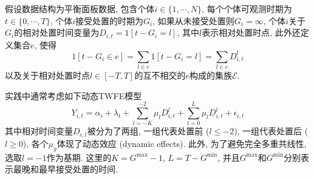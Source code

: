 \documentclass[cn,blue,14pt,screen,bibstyle=gb7714-2015]{elegantnote}
\begin{document}
假设数据结构为平衡面板数据, 包含个体$i\in\{1,\cdots,N\}$, 每个个体可观测时期为$t\in\{0,\cdots,T\}$, 个体$i$接受处置的时期为$G_i$, 如果从未接受处置则$G_i=\infty$, 个体$i$关于$G_i$的相对处置时间变量为$D_{i,t}=1[t-G_i=l]$, 其中$l$表示相对处置时点, 此外还定义集合$e$, 使得
$$1[t-G_i\in e]=\sum_{l\in e}1[t-G_i=l]=\sum_{l\in e}D_{i,t}^l$$
以及关于相对处置时点$l\in [-T,T]$的互不相交的$e$构成的集族$\mathcal{E}$.

实践中通常考虑如下动态TWFE模型
$$Y_{i,t}=\alpha_i+\lambda_t+\sum_{l=-K}^{-2}\mu_lD_{i,t}^l+\sum_{l=0}^{L}\mu_lD_{i,t}^l+\epsilon_{i,t}$$
其中相对时间变量$D_{i,t}$被分为了两组, 一组代表处置前 ($l\leq-2$), 一组代表处置后 ($l\ge0$), 各个$\mu_g$体现了动态效应 (dynamic effects). 此外, 为了避免完全多重共线性, 选取$l=-1$作为基期. 这里的$K=G^{\max}-1$, $L=T-G^{\min}$, 并且$G^{\max}$和$G^{\min}$分别表示最晚和最早接受处置的时间.
\end{document}
